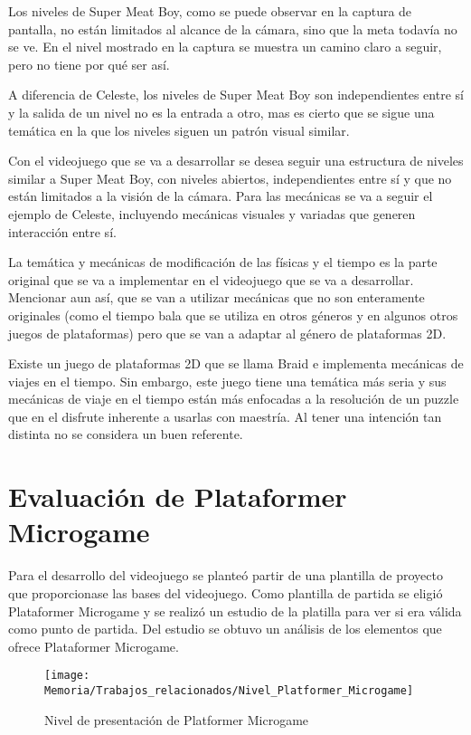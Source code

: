 Los niveles de Super Meat Boy, como se puede observar en la captura de pantalla, no están limitados al alcance de la cámara, sino que la meta todavía no se ve. En el nivel mostrado en la captura se muestra un camino claro a seguir, pero no tiene por qué ser así.

A diferencia de Celeste, los niveles de Super Meat Boy son independientes entre sí y la salida de un nivel no es la entrada a otro, mas es cierto que se sigue una temática en la que los niveles siguen un patrón visual similar. 

Con el videojuego que se va a desarrollar se desea seguir una estructura de niveles similar a Super Meat Boy, con niveles abiertos, independientes entre sí y que no están limitados a la visión de la cámara.
Para las mecánicas se va a seguir el ejemplo de Celeste, incluyendo mecánicas visuales y variadas que generen interacción entre sí.

La temática y mecánicas de modificación de las físicas y el tiempo es la parte original que se va a implementar en el videojuego que se va a desarrollar. Mencionar aun así, que se van a utilizar mecánicas que no son enteramente originales (como el tiempo bala que se utiliza en otros géneros y en algunos otros juegos de plataformas) pero que se van a adaptar al género de plataformas 2D.

Existe un juego de plataformas 2D que se llama Braid \cite{Braid} e implementa mecánicas de viajes en el tiempo. Sin embargo, este juego tiene una temática más seria y sus mecánicas de viaje en el tiempo están más enfocadas a la resolución de un puzzle que en el disfrute inherente a usarlas con maestría. Al tener una intención tan distinta no se considera un buen referente.

\section{Evaluación de Plataformer Microgame \cite{PlatformerMicrogame}}
Para el desarrollo del videojuego se planteó partir de una plantilla de proyecto que proporcionase las bases del videojuego. Como plantilla de partida se eligió Plataformer Microgame y se realizó un estudio de la platilla para ver si era válida como punto de partida. Del estudio se obtuvo un análisis de los elementos que ofrece Plataformer Microgame.

\begin{figure}[h]
\centering
\texttt{[image: Memoria/Trabajos\_relacionados/Nivel\_Platformer\_Microgame]}
\caption{Nivel de presentación de Platformer Microgame}
\end{figure}

